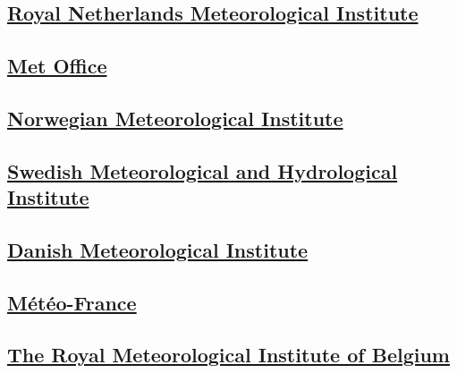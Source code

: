 \hypertarget{royal-netherlands-meteorological-institute}{%
\subsection{\texorpdfstring{\href{https://data.knmi.nl/datasets}{Royal
Netherlands Meteorological
Institute}}{Royal Netherlands Meteorological Institute}}\label{royal-netherlands-meteorological-institute}}

\hypertarget{met-office}{%
\subsection{\texorpdfstring{\href{https://www.metoffice.gov.uk/datapoint}{Met
Office}}{Met Office}}\label{met-office}}

\hypertarget{norwegian-meteorological-institute}{%
\subsection{\texorpdfstring{\href{https://www.met.no/en/free-meteorological-data}{Norwegian
Meteorological
Institute}}{Norwegian Meteorological Institute}}\label{norwegian-meteorological-institute}}

\hypertarget{swedish-meteorological-and-hydrological-institute}{%
\subsection{\texorpdfstring{\href{https://www.smhi.se/en/services/professional-services/data-and-statistics}{Swedish
Meteorological and Hydrological
Institute}}{Swedish Meteorological and Hydrological Institute}}\label{swedish-meteorological-and-hydrological-institute}}

\hypertarget{danish-meteorological-institute}{%
\subsection{\texorpdfstring{\href{http://research.dmi.dk/data/}{Danish
Meteorological
Institute}}{Danish Meteorological Institute}}\label{danish-meteorological-institute}}

\hypertarget{m-t-o-france}{%
\subsection{\texorpdfstring{\href{https://donneespubliques.meteofrance.fr/}{Météo-France}}{Météo-France}}\label{m-t-o-france}}

\hypertarget{the-royal-meteorological-institute-of-belgium}{%
\subsection{\texorpdfstring{\href{https://opendata.meteo.be/}{The Royal
Meteorological Institute of
Belgium}}{The Royal Meteorological Institute of Belgium}}\label{the-royal-meteorological-institute-of-belgium}}

